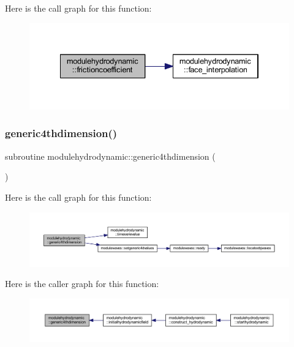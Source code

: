 Here is the call graph for this function\+:\nopagebreak
\begin{figure}[H]
\begin{center}
\leavevmode
\includegraphics[width=334pt]{namespacemodulehydrodynamic_aa1565fcf41a2baafe5216a3a1a3a963f_cgraph}
\end{center}
\end{figure}
\mbox{\label{namespacemodulehydrodynamic_a1edb0b24590f8074445b2a82f3bf1daf}} 
\subsubsection{\texorpdfstring{generic4thdimension()}{generic4thdimension()}}
{\footnotesize\ttfamily subroutine modulehydrodynamic\+::generic4thdimension (\begin{DoxyParamCaption}{ }\end{DoxyParamCaption})\hspace{0.3cm}{\ttfamily [private]}}

Here is the call graph for this function\+:\nopagebreak
\begin{figure}[H]
\begin{center}
\leavevmode
\includegraphics[width=350pt]{namespacemodulehydrodynamic_a1edb0b24590f8074445b2a82f3bf1daf_cgraph}
\end{center}
\end{figure}
Here is the caller graph for this function\+:\nopagebreak
\begin{figure}[H]
\begin{center}
\leavevmode
\includegraphics[width=350pt]{namespacemodulehydrodynamic_a1edb0b24590f8074445b2a82f3bf1daf_icgraph}
\end{center}
\end{figure}
\mbox{\label{namespacemodulehydrodynamic_a64e767d6cd62ef19087fffd022d0ca4a}} 
